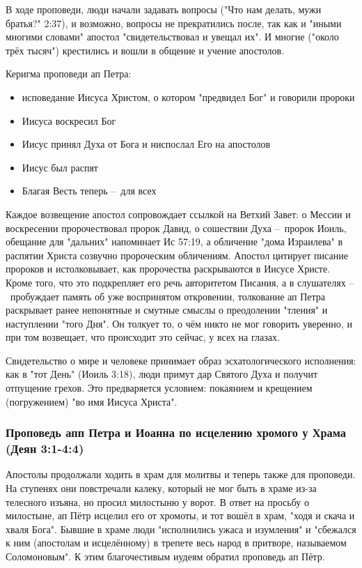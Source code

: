В ходе проповеди, люди начали задавать вопросы ("Что нам делать, мужи братья?" 2:37), и возможно, вопросы не прекратились после, так как и "иными многими словами" апостол "свидетельствовал и увещал их".
И многие ("около трёх тысяч") крестились и вошли в общение и учение апостолов.

Керигма проповеди ап Петра: 
\begin{itemize}
 \item исповедание Иисуса Христом, о котором "предвидел Бог" и говорили пророки
 \item Иисуса воскресил Бог
 \item Иисус принял Духа от Бога и ниспослал Его на апостолов
 \item Иисус был распят
 \item Благая Весть теперь – для всех
\end{itemize}

Каждое возвещение апостол сопровождает ссылкой на Ветхий Завет: о Мессии и воскресении пророчествовал пророк Давид, о сошествии Духа – пророк Иоиль, обещание для "дальних" напоминает Ис 57:19,
а обличение "дома Израилева" в распятии Христа созвучно пророческим обличениям.
Апостол цитирует писание пророков и истолковывает, как пророчества раскрываются в Иисусе Христе.
Кроме того, что это подкрепляет его речь авторитетом Писания, а в слушателях – пробуждает память об уже воспринятом откровении,
толкование ап Петра раскрывает ранее непонятные и смутные смыслы о преодолении "тления" и наступлении "того Дня".
Он толкует то, о чём никто не мог говорить уверенно, и при том возвещает, что происходит это сейчас, у всех на глазах.

Свидетельство о мире и человеке принимает образ эсхатологического исполнения: как в "тот День" (Иоиль 3:18), люди примут дар Святого Духа и получит отпущение грехов.
Это предваряется условием: покаянием и крещением (погружением) "во имя Иисуса Христа".

\subsubsection*{Проповедь апп Петра и Иоанна по исцелению хромого у Храма (Деян 3:1-4:4)}
Апостолы продолжали ходить в храм для молитвы и теперь также для проповеди.
На ступенях они повстречали калеку, который не мог быть в храме из-за телесного изъяна, но просил милостыню у ворот.
В ответ на просьбу о милостыне, ап Пётр исцелил его от хромоты, и тот вошёл в храм, "ходя и скача и хваля Бога".
Бывшие в храме люди "исполнились ужаса и изумления" и "сбежался к ним (апостолам и исцелённому) в трепете весь народ в притворе, называемом Соломоновым".
К этим благочестивым иудеям обратил проповедь ап Пётр.

